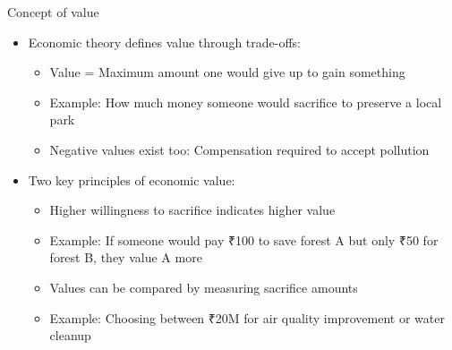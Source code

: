 \documentclass[
  ignorenonframetext,
]{beamer}
\providecommand{\tightlist}{%
  \setlength{\itemsep}{0pt}\setlength{\parskip}{0pt}}\usepackage{longtable,booktabs,array}
\begin{document}
\begin{frame}{Concept of value}
\label{concept-of-value}
\begin{itemize}
\tightlist
\item
  Economic theory defines value through trade-offs:

  \begin{itemize}
  \tightlist
  \item
    Value = Maximum amount one would give up to gain something
  \item
    Example: How much money someone would sacrifice to preserve a local
    park
  \item
    Negative values exist too: Compensation required to accept pollution
  \end{itemize}
\item
  Two key principles of economic value:

  \begin{itemize}
  \tightlist
  \item
    Higher willingness to sacrifice indicates higher value
  \item
    Example: If someone would pay ₹100 to save forest A but only ₹50 for
    forest B, they value A more
  \item
    Values can be compared by measuring sacrifice amounts
  \item
    Example: Choosing between ₹20M for air quality improvement or water
    cleanup
  \end{itemize}
\end{itemize}
\end{frame}
\end{document}

